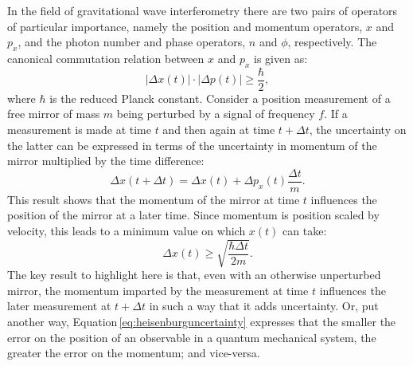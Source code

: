 In the field of gravitational wave interferometry there are two pairs of operators of particular importance, namely the position and momentum operators, $x$ and $p_x$, and the photon number and phase operators, $n$ and $\phi$, respectively. The canonical commutation relation between $x$ and $p_x$ is given as:
\begin{equation}
 | \Delta x\left( t \right) | \cdot |\Delta p\left( t \right) | \geq
\frac{\hbar}{2},
 \label{eq:heisenburguncertainty}
\end{equation}
where $\hbar$ is the reduced Planck constant. Consider a position measurement of a free mirror of mass $m$ being perturbed by a signal of frequency $f$. If a measurement is made at time $t$ and then again at time $t + \Delta t$, the uncertainty on the latter can be expressed in terms of the uncertainty in momentum of the mirror multiplied by the time difference:
\begin{equation}
 \Delta x \left( t + \Delta t \right) = \Delta x \left( t \right) + \Delta p_x
\left( t \right) \frac{\Delta t}{m}.
 \label{eq:heisenburgtime}
\end{equation}
This result shows that the momentum of the mirror at time $t$ influences the position of the mirror at a later time. Since momentum is position scaled by velocity, this leads to a minimum value on which $x \left( t \right)$ can take:
\begin{equation}
 \Delta x \left( t \right) \geq \sqrt{\frac{\hbar \Delta t}{2m}}.
\end{equation}
The key result to highlight here is that, even with an otherwise unperturbed mirror, the momentum imparted by the measurement at time $t$ influences the later measurement at $t + \Delta t$ in such a way that it adds uncertainty. Or, put another way, Equation\,\ref{eq:heisenburguncertainty} expresses that the smaller the error on the position of an observable in a quantum mechanical system, the greater the error on the momentum; and vice-versa.

